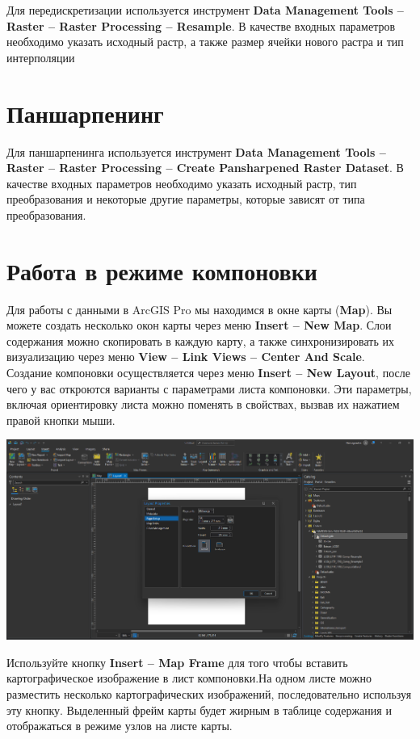 \documentclass[
  12pt,
]{book}
\begin{document}
Для передискретизации используется инструмент \textbf{Data Management Tools -- Raster -- Raster Processing -- Resample}. В качестве входных параметров необходимо указать исходный растр, а также размер ячейки нового растра и тип интерполяции

\hypertarget{pansharpen-pansharpen}{%
\section{Паншарпенинг}\label{pansharpen-pansharpen}}

Для паншарпенинга используется инструмент \textbf{Data Management Tools -- Raster -- Raster Processing -- Create Pansharpened Raster Dataset}. В качестве входных параметров необходимо указать исходный растр, тип преобразования и некоторые другие параметры, которые зависят от типа преобразования.

\hypertarget{pansharpen-layout}{%
\section{Работа в режиме компоновки}\label{pansharpen-layout}}

Для работы с данными в ArcGIS Pro мы находимся в окне карты (\textbf{Map}). Вы можете создать несколько окон карты через меню \textbf{Insert -- New Map}. Слои содержания можно скопировать в каждую карту, а также синхронизировать их визуализацию через меню \textbf{View -- Link Views -- Center And Scale}. Создание компоновки осуществляется через меню \textbf{Insert -- New Layout}, после чего у вас откроются варианты с параметрами листа компоновки. Эти параметры, включая ориентировку листа можно поменять в свойствах, вызвав их нажатием правой кнопки мыши.

\includegraphics{images/Ref01/Layout_Properties.png}

Используйте кнопку \textbf{Insert -- Map Frame} для того чтобы вставить картографическое изображение в лист компоновки.На одном листе можно разместить несколько картографических изображений, последовательно используя эту кнопку. Выделенный фрейм карты будет жирным в таблице содержания и отображаться в режиме узлов на листе карты.
\end{document}
